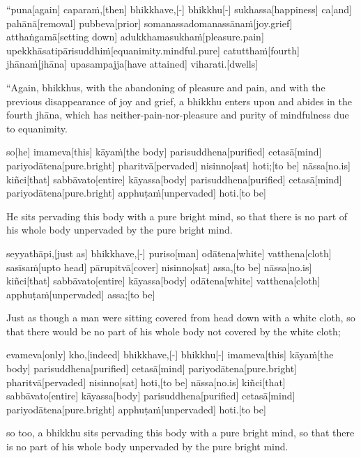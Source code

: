\vskip 0.05in
\begin{samepage}
\begingl[glneveryline={\PaliGlossA,\PaliGlossB}]
“puna[again] caparaṁ,[then] bhikkhave,[-] bhikkhu[-] sukhassa[happiness] ca[and] pahānā[removal] pubbeva[prior] somanassadomanassānaṁ[joy.grief] atthaṅgamā[setting down] adukkhamasukhaṁ[pleasure.pain] upekkhāsatipārisuddhiṁ[equanimity.mindful.pure] catutthaṁ[fourth] jhānaṁ[jhāna] upasampajja[have attained] viharati.[dwells]
\endgl
\nopagebreak
\linespread{0.5}
\begin{spacin}{0.2}
{\PaliGlossFT “Again, bhikkhus, with the abandoning of pleasure and pain, and with the previous disappearance of joy and grief, a bhikkhu enters upon and abides in the fourth jhāna, which has neither-pain-nor-pleasure and purity of mindfulness due to equanimity.}
\end{spacin}
\vskip 12pt
\end{samepage}
\begin{samepage}
\begingl[glneveryline={\PaliGlossA,\PaliGlossB}]
so[he] imameva[this] kāyaṁ[the body] parisuddhena[purified] cetasā[mind] pariyodātena[pure.bright] pharitvā[pervaded] nisinno[sat] hoti;[to be] nāssa[no.is] kiñci[that] sabbāvato[entire] kāyassa[body] parisuddhena[purified] cetasā[mind] pariyodātena[pure.bright] apphuṭaṁ[unpervaded] hoti.[to be]
\endgl
\nopagebreak
\linespread{0.5}
\begin{spacin}{0.2}
{\PaliGlossFT He sits pervading this body with a pure bright mind, so that there is no part of his whole body unpervaded by the pure bright mind.}
\end{spacin}
\vskip 12pt
\end{samepage}
\begin{samepage}
\begingl[glneveryline={\PaliGlossA,\PaliGlossB}]
seyyathāpi,[just as] bhikkhave,[-] puriso[man] odātena[white] vatthena[cloth] sasīsaṁ[upto head] pārupitvā[cover] nisinno[sat] assa,[to be] nāssa[no.is] kiñci[that] sabbāvato[entire] kāyassa[body] odātena[white] vatthena[cloth] apphuṭaṁ[unpervaded] assa;[to be]
\endgl
\nopagebreak
\linespread{0.5}
\begin{spacin}{0.2}
{\PaliGlossFT Just as though a man were sitting covered from head down with a white cloth, so that there would be no part of his whole body not covered by the white cloth;}
\end{spacin}
\vskip 12pt
\end{samepage}
\begin{samepage}
\begingl[glneveryline={\PaliGlossA,\PaliGlossB}]
evameva[only] kho,[indeed] bhikkhave,[-] bhikkhu[-] imameva[this] kāyaṁ[the body] parisuddhena[purified] cetasā[mind] pariyodātena[pure.bright] pharitvā[pervaded] nisinno[sat] hoti,[to be] nāssa[no.is] kiñci[that] sabbāvato[entire] kāyassa[body] parisuddhena[purified] cetasā[mind] pariyodātena[pure.bright] apphuṭaṁ[unpervaded] hoti.[to be]
\endgl
\nopagebreak
\linespread{0.5}
\begin{spacin}{0.2}
{\PaliGlossFT so too, a bhikkhu sits pervading this body with a pure bright mind, so that there is no part of his whole body unpervaded by the pure bright mind.}
\end{spacin}
\vskip 12pt
\end{samepage}
